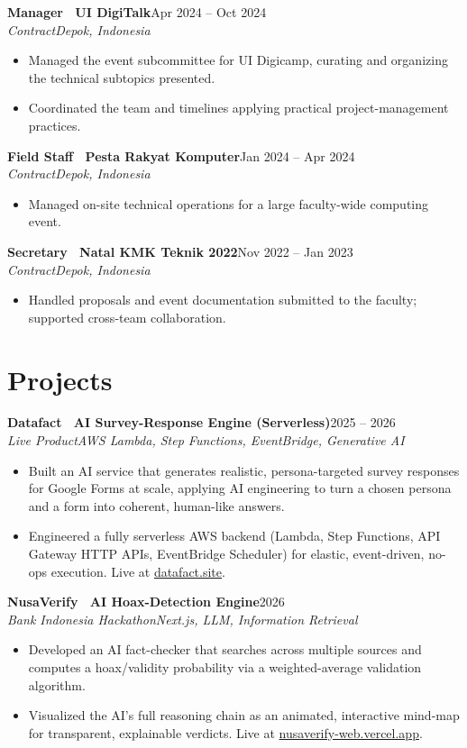 \documentclass[a4paper,11pt]{article}
\newcommand{\entry}[4]{%
  \vspace{7pt}
  {\bfseries #1}\hfill{\normalsize #2}\\[2pt]
  {\itshape #3}\hfill{\itshape\small #4}\\[1pt]
}
\begin{document}
\entry{Manager \textbar\ UI DigiTalk}{Apr 2024 -- Oct 2024}{Contract}{Depok, Indonesia}
\begin{itemize}
  \item Managed the event subcommittee for UI Digicamp, curating and organizing the technical subtopics presented.
  \item Coordinated the team and timelines applying practical project-management practices.
\end{itemize}

\entry{Field Staff \textbar\ Pesta Rakyat Komputer}{Jan 2024 -- Apr 2024}{Contract}{Depok, Indonesia}
\begin{itemize}
  \item Managed on-site technical operations for a large faculty-wide computing event.
\end{itemize}

\entry{Secretary \textbar\ Natal KMK Teknik 2022}{Nov 2022 -- Jan 2023}{Contract}{Depok, Indonesia}
\begin{itemize}
  \item Handled proposals and event documentation submitted to the faculty; supported cross-team collaboration.
\end{itemize}

\section{Projects}

\entry{Datafact \textbar\ AI Survey-Response Engine (Serverless)}{2025 -- 2026}{Live Product}{AWS Lambda, Step Functions, EventBridge, Generative AI}
\begin{itemize}
  \item Built an AI service that generates realistic, persona-targeted survey responses for Google Forms at scale, applying AI engineering to turn a chosen persona and a form into coherent, human-like answers.
  \item Engineered a fully serverless AWS backend (Lambda, Step Functions, API Gateway HTTP APIs, EventBridge Scheduler) for elastic, event-driven, no-ops execution. Live at \href{https://www.datafact.site}{datafact.site}.
\end{itemize}

\entry{NusaVerify \textbar\ AI Hoax-Detection Engine}{2026}{Bank Indonesia Hackathon}{Next.js, LLM, Information Retrieval}
\begin{itemize}
  \item Developed an AI fact-checker that searches across multiple sources and computes a hoax/validity probability via a weighted-average validation algorithm.
  \item Visualized the AI's full reasoning chain as an animated, interactive mind-map for transparent, explainable verdicts. Live at \href{https://nusaverify-web.vercel.app/}{nusaverify-web.vercel.app}.
\end{itemize}
\end{document}
